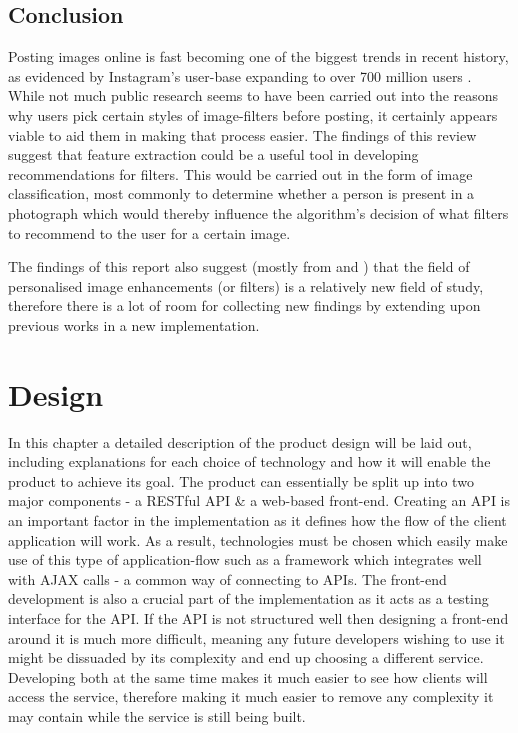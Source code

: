 \documentclass[a4paper,12pt]{report}
\begin{document}
  \section{Conclusion}
    Posting images online is fast becoming one of the biggest trends in recent history, as evidenced by Instagram's user-base expanding to over 700 million users \citep{instagram2017users}. While not much public research seems to have been carried out into the reasons why users pick certain styles of image-filters before posting, it certainly appears viable to aid them in making that process easier.
    The findings of this review suggest that feature extraction could be a useful tool in developing recommendations for filters. This would be carried out in the form of image classification, most commonly to determine whether a person is present in a photograph which would thereby influence the algorithm's decision of what filters to recommend to the user for a certain image.

    The findings of this report also suggest (mostly from \cite{kang2010personalization} and \cite{caicedo2011collaborative}) that the field of personalised image enhancements (or filters) is a relatively new field of study, therefore there is a lot of room for collecting new findings by extending upon previous works in a new implementation.

\chapter{Design}
  In this chapter a detailed description of the product design will be laid out, including explanations for each choice of technology and how it will enable the product to achieve its goal. The product can essentially be split up into two major components - a RESTful API \& a web-based front-end. Creating an API is an important factor in the implementation as it defines how the flow of the client application will work. As a result, technologies must be chosen which easily make use of this type of application-flow such as a framework which integrates well with AJAX calls - a common way of connecting to APIs. The front-end development is also a crucial part of the implementation as it acts as a testing interface for the API. If the API is not structured well then designing a front-end around it is much more difficult, meaning any future developers wishing to use it might be dissuaded by its complexity and end up choosing a different service. Developing both at the same time makes it much easier to see how clients will access the service, therefore making it much easier to remove any complexity it may contain while the service is still being built.
\end{document}
